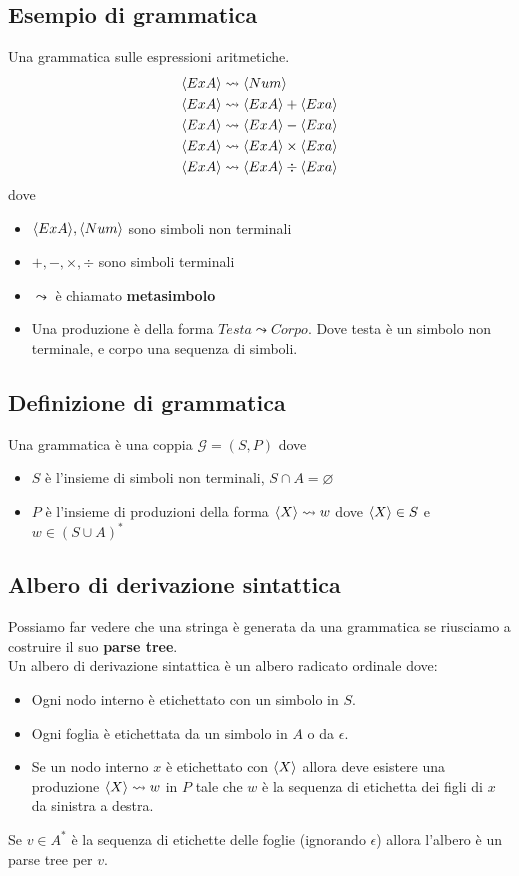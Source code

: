 \documentclass{article}
\begin{document}
\subsection*{Esempio di grammatica}
Una grammatica sulle espressioni aritmetiche.
\begin{align*}
    \langle ExA \rangle & \leadsto \langle Num \rangle                     \\
    \langle ExA \rangle & \leadsto \langle ExA \rangle + \langle Exa \rangle      \\
    \langle ExA \rangle & \leadsto \langle ExA \rangle - \langle Exa \rangle      \\
    \langle ExA \rangle & \leadsto \langle ExA \rangle \times \langle Exa \rangle \\
    \langle ExA \rangle & \leadsto \langle ExA \rangle \div \langle Exa \rangle
\end{align*}
dove
\begin{itemize}
    \item \(\langle ExA \rangle, \langle Num \rangle\) sono simboli non terminali
    \item \(+, -, \times, \div\) sono simboli terminali
    \item \(\leadsto\) è chiamato \textbf{metasimbolo}
    \item Una produzione è della forma \(Testa \leadsto Corpo\). Dove testa è un simbolo non terminale, e corpo una sequenza di simboli.
\end{itemize}
\subsection*{Definizione di grammatica}
Una grammatica è una coppia \(\mathcal{G} = (S, P)\) dove
\begin{itemize}
    \item \(S\) è l'insieme di simboli non terminali, \(S \cap A = \varnothing\)
    \item \(P\) è l'insieme di produzioni della forma \(\langle X \rangle \leadsto w\) dove \(\langle X \rangle \in S\) e \(w \in (S \cup A)^*\)
\end{itemize}
\subsection*{Albero di derivazione sintattica}
Possiamo far vedere che una stringa è generata da una grammatica se riusciamo a costruire il suo \textbf{parse tree}. \\
Un albero di derivazione sintattica è un albero radicato ordinale dove:
\begin{itemize}
    \item Ogni nodo interno è etichettato con un simbolo in \(S\).
    \item Ogni foglia è etichettata da un simbolo in \(A\) o da \(\epsilon\).
    \item Se un nodo interno \(x\) è etichettato con \(\langle X \rangle\) allora deve esistere una produzione \(\langle X \rangle \leadsto w\) in \(P\) tale che \(w\) è la sequenza di etichetta dei figli di \(x\) da sinistra a destra.
\end{itemize}
Se \(v \in A^*\) è la sequenza di etichette delle foglie (ignorando \(\epsilon\)) allora l'albero è un parse tree per \(v\).
\end{document}
